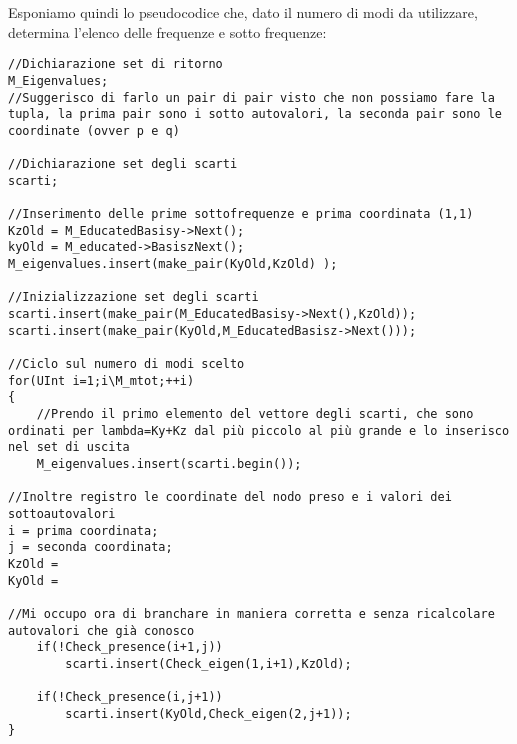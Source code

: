 Esponiamo quindi lo pseudocodice che, dato il numero di modi da utilizzare, determina l'elenco delle frequenze e sotto frequenze:


\begin{lstlisting}
//Dichiarazione set di ritorno
M_Eigenvalues;
//Suggerisco di farlo un pair di pair visto che non possiamo fare la tupla, la prima pair sono i sotto autovalori, la seconda pair sono le coordinate (ovver p e q)

//Dichiarazione set degli scarti
scarti;

//Inserimento delle prime sottofrequenze e prima coordinata (1,1)
KzOld = M_EducatedBasisy->Next();
kyOld = M_educated->BasiszNext();
M_eigenvalues.insert(make_pair(KyOld,KzOld) );

//Inizializzazione set degli scarti
scarti.insert(make_pair(M_EducatedBasisy->Next(),KzOld));
scarti.insert(make_pair(KyOld,M_EducatedBasisz->Next()));

//Ciclo sul numero di modi scelto
for(UInt i=1;i\M_mtot;++i)
{
	//Prendo il primo elemento del vettore degli scarti, che sono ordinati per lambda=Ky+Kz dal più piccolo al più grande e lo inserisco nel set di uscita
	M_eigenvalues.insert(scarti.begin());

//Inoltre registro le coordinate del nodo preso e i valori dei sottoautovalori
i = prima coordinata;
j = seconda coordinata;
KzOld =  
KyOld =

//Mi occupo ora di branchare in maniera corretta e senza ricalcolare autovalori che già conosco
	if(!Check_presence(i+1,j))
		scarti.insert(Check_eigen(1,i+1),KzOld);

	if(!Check_presence(i,j+1))		
		scarti.insert(KyOld,Check_eigen(2,j+1));
}
\end{lstlisting}

